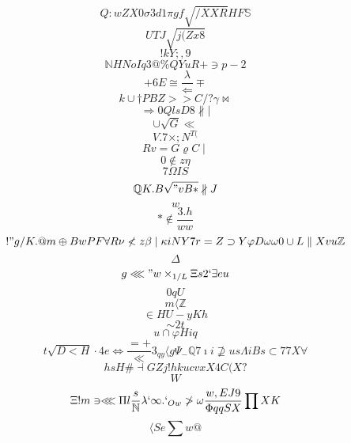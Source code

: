 \documentclass[12pt]{article}
\begin{document}
        \begin{minipage}[t][0pt]{\linewidth}

        \[Q:wZX0\sigma 3 d 1\pi g f\sqrt{/XXR}HF\mathbb{S}\]
\[UTJ\sqrt{j(Zx8}\]
\[!kY;,9\]
\[\mathbb{N} H N o I q 3 @\% Q Y u R +\ni p - {2}\]
\[+6E\cong\frac{\lambda}{\Leftarrow}\mp\]
\[k\cup\dagger P B Z > > C / ?\gamma\bowtie\]
\[\Longrightarrow 0 Q l s D 8\nparallel\mid\]
\[\cup\sqrt{G}\ll\]
\[V.7\times ; N^{T(}\]
\[Rv=G\varrho C\mid\]
\[0\notin z\eta\]
\[7\Omega I S\]
\[\mathbb{Q} K . B\sqrt{"vB*}\nparallel J\]
\[w\]
\[*\notin\frac{3.h}{ww}\]
\[!"g/K.@ {m}\oplus B w P F\forall R\nu\nless z\beta\mid\kappa i N Y 7 {r=Z}\supset Y\varphi D\omega\omega 0\cup L\parallel X v u\mathbb{Z}\]
\[\Delta\]
\[g\lll " w\times_{1/L}\Xi s 2 `\exists e u\]
\[0qU\]
\[m\langle\mathbb{Z}\]
\[\in H U - y K h\]
\[\sim 2 t\]
\[ u\cap\varphi H i q\]
\[\]
\[t\sqrt{D<H}\cdot 4 e\Leftrightarrow\frac{=+}{\ll} 3_{qy}\langle g\Psi_{-}\mathbb{Q} 7 {\imath i}\nsupseteq u s\Lambda i B s\subset 7 7 X\forall\]
\[hsH\#\dashv G Z j ! h k u c {vxX4C(X?}\]
\[W\]
\[\Xi ! m\ni\lll\Pi l\frac{s}{\mathbb{N}}\lambda {`}\infty . `_{Ow}\ngtr\omega\frac{w,EJ9}{\Phi q q S X}\prod X K\]
\[\langle S e\sum w @
        \]
\end{minipage}
\end{document}
